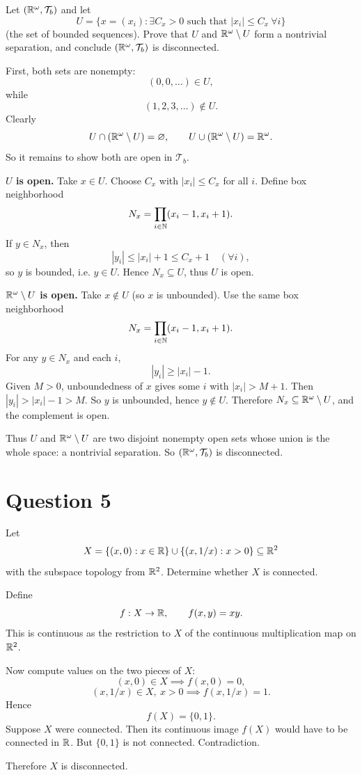\documentclass{article}
\begin{document}
Let $(\mathbb{R}^\omega,\mathcal{T}_b)$ and let
\[
  U=\{x=(x_i): \exists C_x>0\text{ such that }|x_i|\le C_x\ \forall i\}
\]
(the set of bounded sequences).
Prove that $U$ and $\mathbb{R}^\omega\setminus U$ form a nontrivial
separation, and conclude $(\mathbb{R}^\omega,\mathcal{T}_b)$ is disconnected.

\begin{solution}
  First, both sets are nonempty:
  \[
    (0,0,\dots)\in U,
  \]
  while
  \[
    (1,2,3,\dots)\notin U.
  \]
  Clearly
  \[
    U\cap(\mathbb{R}^\omega\setminus U)=\varnothing,
    \qquad
    U\cup(\mathbb{R}^\omega\setminus U)=\mathbb{R}^\omega.
  \]
  So it remains to show both are open in $\mathcal{T}_b$.

  \textbf{$U$ is open.}
  Take $x\in U$. Choose $C_x$ with $|x_i|\le C_x$ for all $i$.
  Define box neighborhood
  \[
    N_x=\prod_{i\in\mathbb{N}}(x_i-1,x_i+1).
  \]
  If $y\in N_x$, then
  \[
    |y_i|\le |x_i|+1\le C_x+1\quad(\forall i),
  \]
  so $y$ is bounded, i.e. $y\in U$.
  Hence $N_x\subseteq U$, thus $U$ is open.

  \textbf{$\mathbb{R}^\omega\setminus U$ is open.}
  Take $x\notin U$ (so $x$ is unbounded).
  Use the same box neighborhood
  \[
    N_x=\prod_{i\in\mathbb{N}}(x_i-1,x_i+1).
  \]
  For any $y\in N_x$ and each $i$,
  \[
    |y_i|\ge |x_i|-1.
  \]
  Given $M>0$, unboundedness of $x$ gives some $i$ with $|x_i|>M+1$.
  Then $|y_i|>|x_i|-1>M$.
  So $y$ is unbounded, hence $y\notin U$.
  Therefore $N_x\subseteq \mathbb{R}^\omega\setminus U$, and the complement is open.

  Thus $U$ and $\mathbb{R}^\omega\setminus U$ are two disjoint nonempty open
  sets whose union is the whole space: a nontrivial separation.
  So $(\mathbb{R}^\omega,\mathcal{T}_b)$ is disconnected.
\end{solution}

\section{Question 5}

Let
\[
  X=\{(x,0):x\in\mathbb{R}\}\cup\{(x,1/x):x>0\}\subseteq\mathbb{R}^2
\]
with the subspace topology from $\mathbb{R}^2$. Determine whether $X$ is connected.

\begin{solution}
  Define
  \[
    f:X\to\mathbb{R},\qquad f(x,y)=xy.
  \]
  This is continuous as the restriction to $X$ of the continuous
  multiplication map on $\mathbb{R}^2$.

  Now compute values on the two pieces of $X$:
  \[
    (x,0)\in X \implies f(x,0)=0,
  \]
  \[
    (x,1/x)\in X,\ x>0 \implies f(x,1/x)=1.
  \]
  Hence
  \[
    f(X)=\{0,1\}.
  \]
  Suppose $X$ were connected. Then its continuous image $f(X)$ would
  have to be connected in $\mathbb{R}$.
  But $\{0,1\}$ is not connected.
  Contradiction.

  Therefore $X$ is disconnected.
\end{solution}
\end{document}
